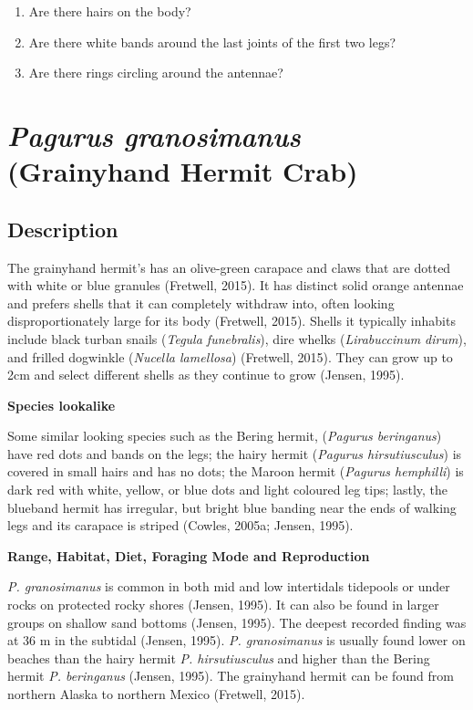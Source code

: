 \documentclass[
]{article}
\providecommand{\tightlist}{%
  \setlength{\itemsep}{0pt}\setlength{\parskip}{0pt}}
\begin{document}
\begin{enumerate}
\def\labelenumi{\arabic{enumi}.}
\tightlist
\item
  Are there hairs on the body?
\item
  Are there white bands around the last joints of the first two legs?
\item
  Are there rings circling around the antennae?
\end{enumerate}

\newpage

\hypertarget{pagurus-granosimanus-grainyhand-hermit-crab}{%
\section{\texorpdfstring{\emph{Pagurus granosimanus} (Grainyhand Hermit
Crab)}{Pagurus granosimanus (Grainyhand Hermit Crab)}}\label{pagurus-granosimanus-grainyhand-hermit-crab}}

\hypertarget{description-1}{%
\subsection{Description}\label{description-1}}

The grainyhand hermit's has an olive-green carapace and claws that are
dotted with white or blue granules (Fretwell, 2015). It has distinct
solid orange antennae and prefers shells that it can completely withdraw
into, often looking disproportionately large for its body (Fretwell,
2015). Shells it typically inhabits include black turban snails
(\emph{Tegula funebralis}), dire whelks (\emph{Lirabuccinum dirum}), and
frilled dogwinkle (\emph{Nucella lamellosa}) (Fretwell, 2015). They can
grow up to 2cm and select different shells as they continue to grow
(Jensen, 1995).

\textbf{Species lookalike}

Some similar looking species such as the Bering hermit, (\emph{Pagurus
beringanus}) have red dots and bands on the legs; the hairy hermit
(\emph{Pagurus hirsutiusculus}) is covered in small hairs and has no
dots; the Maroon hermit (\emph{Pagurus hemphilli}) is dark red with
white, yellow, or blue dots and light coloured leg tips; lastly, the
blueband hermit has irregular, but bright blue banding near the ends of
walking legs and its carapace is striped (Cowles, 2005a; Jensen, 1995).

\textbf{Range, Habitat, Diet, Foraging Mode and Reproduction}

\emph{P. granosimanus} is common in both mid and low intertidals
tidepools or under rocks on protected rocky shores (Jensen, 1995). It
can also be found in larger groups on shallow sand bottoms (Jensen,
1995). The deepest recorded finding was at 36 m in the subtidal (Jensen,
1995). \emph{P. granosimanus} is usually found lower on beaches than the
hairy hermit \emph{P. hirsutiusculus} and higher than the Bering hermit
\emph{P. beringanus} (Jensen, 1995). The grainyhand hermit can be found
from northern Alaska to northern Mexico (Fretwell, 2015).
\end{document}
